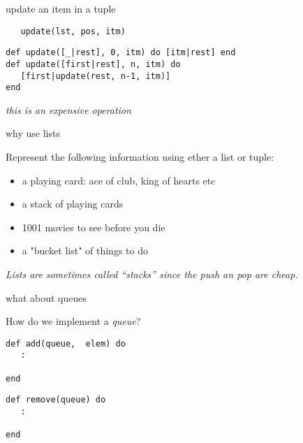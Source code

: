 \begin{frame}[fragile]{update an item in a tuple}

\begin{verbatim}
   update(lst, pos, itm)
\end{verbatim}
  \vspace{20pt}\pause
\begin{verbatim}
def update([_|rest], 0, itm) do [itm|rest] end
def update([first|rest], n, itm) do
   [first|update(rest, n-1, itm)]
end
\end{verbatim}

  \vspace{10pt}\pause
  {\em this is an expensive operation}
\end{frame}



\begin{frame}[fragile]{why use lists}

Represent the following information using ether a list or tuple:
                   
\begin{itemize}
\pause \item a playing card: ace of club, king of hearts etc 
\pause \item a stack of playing cards
\pause \item 1001 movies to see before you die
\pause \item a "bucket list" of  things to do
\end{itemize}

\pause\vspace{20pt}
{\em Lists are sometimes called ``stacks'' since the push an pop are cheap.}
\end{frame}

\begin{frame}[fragile]{what about queues}

  How do we implement a {\em queue}?

\begin{verbatim}
def add(queue,  elem) do
   :

end
\end{verbatim}

\begin{verbatim}
def remove(queue) do
   :

end
\end{verbatim}  
  
\end{frame}

